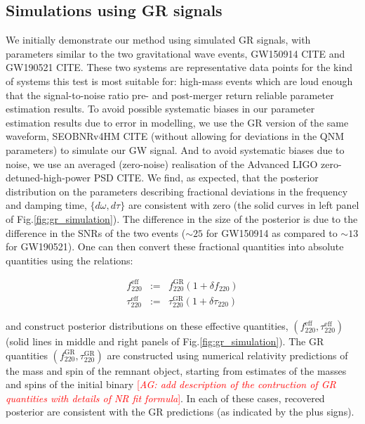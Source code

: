 \documentclass[twocolumn,prd,superscriptaddress,amsfonts,amssymb,amsmath,preprintnumbers]{revtex4-1}
\newcommand{\abhi}[1]{\textcolor{red}{[\textit{AG: #1}]}}
\begin{document}
\fi

\subsection{Simulations using GR signals}\label{ssec:gr_signal}

We initially demonstrate our method using simulated GR signals, with parameters similar to the two gravitational wave events, GW150914 CITE and GW190521 CITE. These two systems are representative data points for the kind of systems this test is most suitable for: high-mass events which are loud enough that the signal-to-noise ratio pre- and post-merger return reliable parameter estimation results. To avoid possible systematic biases in our parameter estimation results due to error in modelling, we use the GR version of the same waveform, SEOBNRv4HM CITE (without allowing for deviations in the QNM parameters) to simulate our GW signal. And to avoid systematic biases due to noise, we use an averaged (zero-noise) realisation of the Advanced LIGO zero-detuned-high-power PSD CITE. We find, as expected, that the posterior distribution on the parameters describing fractional deviations in the frequency and damping time, $\{d\omega,d\tau\}$ are consistent with zero (the solid curves in left panel of Fig.\ref{fig:gr_simulation}). The difference in the size of the posterior is due to the difference in the SNRs of the two events ($\sim 25$ for GW150914 as compared to $\sim 13$ for GW190521). One can then convert these fractional quantities into absolute quantities using the relations:

\begin{eqnarray}
f_{220}^{\text{eff}} &:=& f_{220}^{\text{GR}} (1 + \delta f_{220}) \\
\tau _{220}^{\text{eff}} &:=& \tau _{220}^{\text{GR}} (1 + \delta \tau_{220})
\end{eqnarray}

and construct posterior distributions on these effective quantities, $(f_{220}^{\text{eff}}, \tau _{220}^{\text{eff}})$ (solid lines in middle and right panels of Fig.\ref{fig:gr_simulation}). The GR quantities $(f_{220}^{\text{GR}}, \tau _{220}^{\text{GR}})$ are constructed using numerical relativity predictions of the mass and spin of the remnant object, starting from estimates of the masses and spins of the initial binary \abhi{add description of the contruction of GR quantities with details of NR fit formula}. In each of these cases, recovered posterior are consistent with the GR predictions (as indicated by the plus signs).
\end{document}
